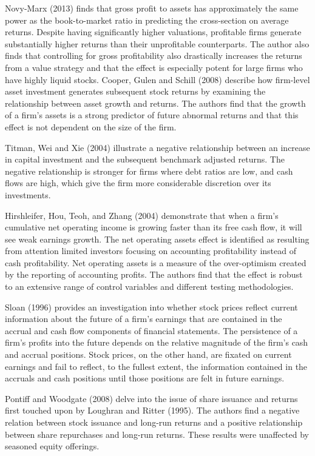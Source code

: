 \documentclass[a4paper]{article}                 %
\begin{document}
Novy-Marx (2013) finds that gross profit to assets has approximately the same power as the book-to-market ratio in predicting the cross-section on average returns. Despite having significantly higher valuations, profitable firms generate substantially higher returns than their unprofitable counterparts. The author also finds that controlling for gross profitability also drastically increases the returns from a value strategy and that the effect is especially potent for large firms who have highly liquid stocks. 
Cooper, Gulen and Schill (2008) describe how firm-level asset investment generates subsequent stock returns by examining the relationship between asset growth and returns. The authors find that the growth of a firm's assets is a strong predictor of future abnormal returns and that this effect is not dependent on the size of the firm. 

Titman, Wei and Xie (2004) illustrate a negative relationship between an increase in capital investment and the subsequent benchmark adjusted returns. The negative relationship is stronger for firms where debt ratios are low, and cash flows are high, which give the firm more considerable discretion over its investments.

Hirshleifer, Hou, Teoh, and Zhang (2004) demonstrate that when a firm’s cumulative net operating income is growing faster than its free cash flow, it will see weak earnings growth. The net operating assets effect is identified as resulting from attention limited investors focusing on accounting profitability instead of cash profitability. Net operating assets is a measure of the over-optimism created by the reporting of accounting profits. The authors find that the effect is robust to an extensive range of control variables and different testing methodologies. 

Sloan (1996) provides an investigation into whether stock prices reflect current information about the future of a firm’s earnings that are contained in the accrual and cash flow components of financial statements. The persistence of a firm’s profits into the future depends on the relative magnitude of the firm's cash and accrual positions. Stock prices, on the other hand, are fixated on current earnings and fail to reflect, to the fullest extent, the information contained in the accruals and cash positions until those positions are felt in future earnings. 

Pontiff and Woodgate (2008) delve into the issue of share issuance and returns first touched upon by Loughran and Ritter (1995). The authors find a negative relation between stock issuance and long-run returns and a positive relationship between share repurchases and long-run returns. These results were unaffected by seasoned equity offerings. 
\end{document}
